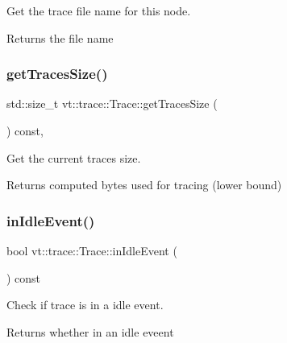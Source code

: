 Get the trace file name for this node. 

\begin{DoxyReturn}{Returns}
the file name 
\end{DoxyReturn}
\mbox{\label{structvt_1_1trace_1_1_trace_a502cebeb41c667ecce682191c69dacd5}} 
\subsubsection{\texorpdfstring{get\+Traces\+Size()}{getTracesSize()}}
{\footnotesize\ttfamily std\+::size\+\_\+t vt\+::trace\+::\+Trace\+::get\+Traces\+Size (\begin{DoxyParamCaption}{ }\end{DoxyParamCaption}) const\hspace{0.3cm}{\ttfamily [inline]}, {\ttfamily [private]}}



Get the current traces size. 

\begin{DoxyReturn}{Returns}
computed bytes used for tracing (lower bound) 
\end{DoxyReturn}
\mbox{\label{structvt_1_1trace_1_1_trace_a1e7429d95dbddd9f235a02800d158d36}} 
\subsubsection{\texorpdfstring{in\+Idle\+Event()}{inIdleEvent()}}
{\footnotesize\ttfamily bool vt\+::trace\+::\+Trace\+::in\+Idle\+Event (\begin{DoxyParamCaption}{ }\end{DoxyParamCaption}) const}



Check if trace is in a idle event. 

\begin{DoxyReturn}{Returns}
whether in an idle eveent 
\end{DoxyReturn}
\mbox{\label{structvt_1_1trace_1_1_trace_a24019edd964c0a307008f8d6a0f1f825}} 
